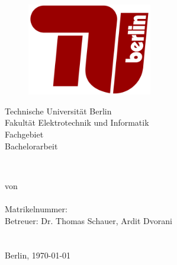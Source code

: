 
\newsavebox{\Prof}

\newsavebox{\Betr}
\begin{titlepage}



	\begin{figure}
		\begin{center}
			\includegraphics[height=4cm]{source/images/Logo/TU_Berlin_Logo.png}
		\end{center}
	\end{figure}

	\begin{center}

	{\Large Technische Universität Berlin}\\[1mm]
	{\large Fakultät Elektrotechnik und Informatik}\\
	{\large Fachgebiet \Fachgebiet}\\
	\vspace{1cm}
	{\LARGE  Bachelorarbeit}

	\vspace{0.5cm}

	{\LARGE\textbf{ \TitelArbeit}}\\


	\vspace{1.cm}

	von\\[2mm]

	\textbf{\large{\DeinName}}\\
	Matrikelnummer: \MatrNo\\[1cm]

	Betreuer:
	Dr. Thomas Schauer,
	Ardit Dvorani\\[2mm]

	\usebox{\Prof: \PrueferEins} \\
	\usebox{\Betr: \PrueferZwei} \\

	\vspace{1cm}
	Berlin, \today
	\end{center}
\end{titlepage}